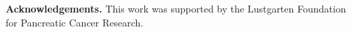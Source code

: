 \documentclass[runningheads]{llncs}
\begin{document}
\noindent\textbf{Acknowledgements.} This work was supported by the Lustgarten Foundation for Pancreatic Cancer Research.


%
%
%

{\small

}
%

% 
% 
\end{document}
